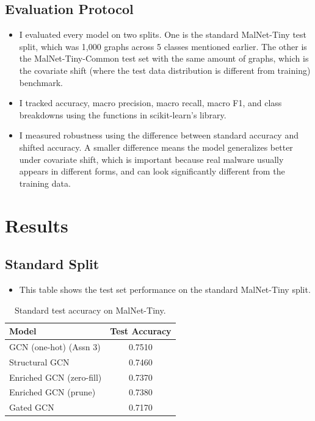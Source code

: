 \documentclass[12pt]{article}
\begin{document}
\subsection{Evaluation Protocol}

\begin{itemize}
    \item I evaluated every model on two splits. One is the standard MalNet-Tiny test split, which was 1,000 graphs across 5 classes mentioned earlier. The other is the MalNet-Tiny-Common test set with the same amount of graphs, which is the covariate shift (where the test data distribution is different from training) benchmark. 
    \item I tracked accuracy, macro precision, macro recall, macro F1, and class breakdowns using the functions in scikit-learn's library.
    \item I measured robustness using the difference between standard accuracy and shifted accuracy. A smaller difference means the model generalizes better under covariate shift, which is important because real malware usually appears in different forms, and can look significantly different from the training data. 
\end{itemize}

\section{Results}

\subsection{Standard Split}

\begin{itemize}
    \item This table shows the test set performance on the standard MalNet-Tiny split.
\end{itemize}

\begin{table}[h]
\centering
\begin{tabular}{lc}
\hline
\textbf{Model} & \textbf{Test Accuracy} \\
\hline
GCN (one-hot) (Assn 3) & 0.7510 \\
Structural GCN & 0.7460 \\
Enriched GCN (zero-fill) & 0.7370 \\
Enriched GCN (prune) & 0.7380 \\
Gated GCN & 0.7170 \\
\hline
\end{tabular}
\caption{Standard test accuracy on MalNet-Tiny.}
\label{tab:standard_results}
\end{table}
\end{document}
